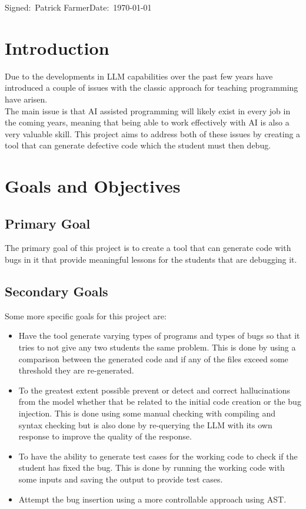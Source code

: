 \documentclass[12pt]{extarticle}
\begin{document}
\small Signed:~Patrick Farmer\hfill Date:~\today

\newpage
\tableofcontents

\newpage
\section{Introduction}

Due to the developments in LLM capabilities over the past few years have introduced a couple of issues with the classic approach for teaching programming have arisen.\\
The main issue is that AI assisted programming will likely exist in every job in the coming years, meaning that being able to work effectively with AI is also a very valuable skill. This project aims to address both of these issues by creating a tool that can generate defective code which the student must then debug.\\

\section{Goals and Objectives}

\subsection{Primary Goal}

The primary goal of this project is to create a tool that can generate code with bugs in it that provide meaningful lessons for the students that are debugging it.

\subsection{Secondary Goals}

Some more specific goals for this project are:
\begin{itemize}
    \item Have the tool generate varying types of programs and types of bugs so that it tries to not give any two students the same problem. This is done by using a comparison between the generated code and if any of the files exceed some threshold they are re-generated.
    \item To the greatest extent possible prevent or detect and correct hallucinations from the model whether that be related to the initial code creation or the bug injection. This is done using some manual checking with compiling and syntax checking but is also done by re-querying the LLM with its own response to improve the quality of the response.
    \item To have the ability to generate test cases for the working code to check if the student has fixed the bug. This is done by running the working code with some inputs and saving the output to provide test cases.
    \item Attempt the bug insertion using a more controllable approach using AST.
\end{itemize}
\end{document}
